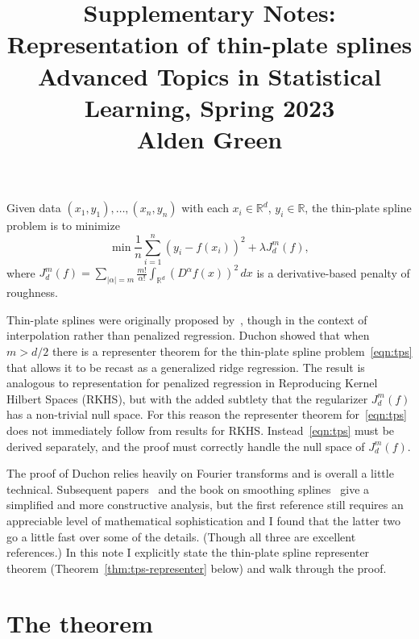 \documentclass{article}
\title{Supplementary Notes: Representation of thin-plate splines \\ \smallskip
\large Advanced Topics in Statistical Learning, Spring 2023 \\ \smallskip
Alden Green}
\author{}
\date{}
\newcommand{\Reals}{\mathbb{R}} %
\newcommand{\Rd}{\Reals^d}
\newcommand{\1}{\mathbf{1}}
\begin{document}
\maketitle
\RaggedRight
\vspace{-50pt}

Given data $(x_1,y_1),\ldots,(x_n,y_n)$ with each $x_i \in \Reals^{d}$, $y_i \in \Reals$, the thin-plate spline problem is to minimize
\begin{equation}
\label{eqn:tps}
\min \frac{1}{n}\sum_{i = 1}^{n}(y_i - f(x_i))^2 + \lambda J_d^{m}(f),
\end{equation}
where $J_d^{m}(f) = \sum_{|\alpha| = m} \frac{m!}{\alpha!} \int_{\Rd} (D^{\alpha}f(x))^2 \,dx$ is a derivative-based penalty of roughness.

Thin-plate splines were originally proposed by~\citet{duchon1977splines}, though in the context of interpolation rather than penalized regression. Duchon showed that when $m > d/2$ there is a representer theorem for the thin-plate spline problem~\eqref{eqn:tps} that allows it to be recast as a generalized ridge regression. The result is analogous to representation for penalized regression in Reproducing Kernel Hilbert Spaces (RKHS), but with the added subtlety that the regularizer $J_d^m(f)$ has a non-trivial null space. For this reason the representer theorem for~\eqref{eqn:tps} does not immediately follow from results for RKHS. Instead~\eqref{eqn:tps} must be derived separately, and the proof must correctly handle the null space of $J_d^m(f)$.

The proof of Duchon relies heavily on Fourier transforms and is overall a little technical. Subsequent papers~\citet{meinguet1979multivariate,wahba1980some} and the book on smoothing splines~\citet{gu2013smoothing} give a simplified and more constructive analysis, but the first reference still requires an appreciable level of mathematical sophistication and I found that the latter two go a little fast over some of the details. (Though all three are excellent references.) In this note I explicitly state the thin-plate spline representer theorem (Theorem~\ref{thm:tps-representer} below) and walk through the proof.

\section{The theorem}
\end{document}
